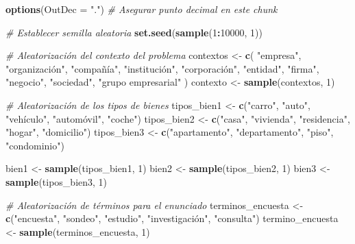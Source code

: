 \documentclass[
]{article}
\author{}
\date{\vspace{-2.5em}}
\newenvironment{Shaded}{\begin{snugshade}}{\end{snugshade}}
\newcommand{\AttributeTok}[1]{\textcolor[rgb]{0.13,0.29,0.53}{#1}}
\newcommand{\CommentTok}[1]{\textcolor[rgb]{0.56,0.35,0.01}{\textit{#1}}}
\newcommand{\DecValTok}[1]{\textcolor[rgb]{0.00,0.00,0.81}{#1}}
\newcommand{\FunctionTok}[1]{\textcolor[rgb]{0.13,0.29,0.53}{\textbf{#1}}}
\newcommand{\NormalTok}[1]{#1}
\newcommand{\OtherTok}[1]{\textcolor[rgb]{0.56,0.35,0.01}{#1}}
\newcommand{\SpecialCharTok}[1]{\textcolor[rgb]{0.81,0.36,0.00}{\textbf{#1}}}
\newcommand{\StringTok}[1]{\textcolor[rgb]{0.31,0.60,0.02}{#1}}
\begin{document}
\begin{Shaded}
\begin{Highlighting}[]
\FunctionTok{options}\NormalTok{(}\AttributeTok{OutDec =} \StringTok{"."}\NormalTok{)  }\CommentTok{\# Asegurar punto decimal en este chunk}

\CommentTok{\# Establecer semilla aleatoria}
\FunctionTok{set.seed}\NormalTok{(}\FunctionTok{sample}\NormalTok{(}\DecValTok{1}\SpecialCharTok{:}\DecValTok{10000}\NormalTok{, }\DecValTok{1}\NormalTok{))}

\CommentTok{\# Aleatorización del contexto del problema}
\NormalTok{contextos }\OtherTok{\textless{}{-}} \FunctionTok{c}\NormalTok{(}
  \StringTok{"empresa"}\NormalTok{, }\StringTok{"organización"}\NormalTok{, }\StringTok{"compañía"}\NormalTok{, }\StringTok{"institución"}\NormalTok{, }\StringTok{"corporación"}\NormalTok{,}
  \StringTok{"entidad"}\NormalTok{, }\StringTok{"firma"}\NormalTok{, }\StringTok{"negocio"}\NormalTok{, }\StringTok{"sociedad"}\NormalTok{, }\StringTok{"grupo empresarial"}
\NormalTok{)}
\NormalTok{contexto }\OtherTok{\textless{}{-}} \FunctionTok{sample}\NormalTok{(contextos, }\DecValTok{1}\NormalTok{)}

\CommentTok{\# Aleatorización de los tipos de bienes}
\NormalTok{tipos\_bien1 }\OtherTok{\textless{}{-}} \FunctionTok{c}\NormalTok{(}\StringTok{"carro"}\NormalTok{, }\StringTok{"auto"}\NormalTok{, }\StringTok{"vehículo"}\NormalTok{, }\StringTok{"automóvil"}\NormalTok{, }\StringTok{"coche"}\NormalTok{)}
\NormalTok{tipos\_bien2 }\OtherTok{\textless{}{-}} \FunctionTok{c}\NormalTok{(}\StringTok{"casa"}\NormalTok{, }\StringTok{"vivienda"}\NormalTok{, }\StringTok{"residencia"}\NormalTok{, }\StringTok{"hogar"}\NormalTok{, }\StringTok{"domicilio"}\NormalTok{)}
\NormalTok{tipos\_bien3 }\OtherTok{\textless{}{-}} \FunctionTok{c}\NormalTok{(}\StringTok{"apartamento"}\NormalTok{, }\StringTok{"departamento"}\NormalTok{, }\StringTok{"piso"}\NormalTok{, }\StringTok{"condominio"}\NormalTok{)}

\NormalTok{bien1 }\OtherTok{\textless{}{-}} \FunctionTok{sample}\NormalTok{(tipos\_bien1, }\DecValTok{1}\NormalTok{)}
\NormalTok{bien2 }\OtherTok{\textless{}{-}} \FunctionTok{sample}\NormalTok{(tipos\_bien2, }\DecValTok{1}\NormalTok{)}
\NormalTok{bien3 }\OtherTok{\textless{}{-}} \FunctionTok{sample}\NormalTok{(tipos\_bien3, }\DecValTok{1}\NormalTok{)}

\CommentTok{\# Aleatorización de términos para el enunciado}
\NormalTok{terminos\_encuesta }\OtherTok{\textless{}{-}} \FunctionTok{c}\NormalTok{(}\StringTok{"encuesta"}\NormalTok{, }\StringTok{"sondeo"}\NormalTok{, }\StringTok{"estudio"}\NormalTok{, }\StringTok{"investigación"}\NormalTok{, }\StringTok{"consulta"}\NormalTok{)}
\NormalTok{termino\_encuesta }\OtherTok{\textless{}{-}} \FunctionTok{sample}\NormalTok{(terminos\_encuesta, }\DecValTok{1}\NormalTok{)}


\end{Highlighting}
\end{Shaded}
\end{document}
